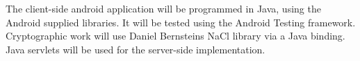 The client-side android application will be programmed in Java, using the Android supplied libraries. It will be tested using the Android Testing framework. Cryptographic work will use Daniel Bernsteins NaCl library via a Java binding. Java servlets will be used for the server-side implementation.
